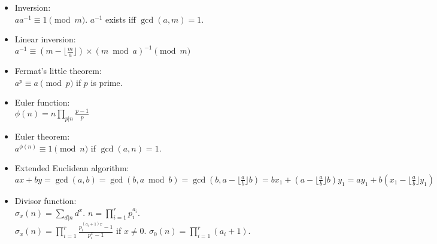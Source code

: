 \documentclass[twocolumn]{article}
\begin{document}
\begin{itemize}
    \item Inversion:\\ $aa^{-1} \equiv 1 \pmod{m}$. $a^{-1}$ exists iff $\gcd(a,m)=1$.
    \item Linear inversion:\\ $a^{-1} \equiv (m - \lfloor\frac{m}{a}\rfloor) \times (m \bmod a)^{-1} \pmod{m}$
    \item Fermat's little theorem:\\ $a^p \equiv a \pmod{p}$ if $p$ is prime.
    \item Euler function:\\ $\phi(n)=n \prod_{p|n} \frac{p-1}{p}$
    \item Euler theorem:\\ $a^{\phi(n)} \equiv 1 \pmod{n}$ if $\gcd(a,n) = 1$.
    \item Extended Euclidean algorithm:\\
    $ax+by=\gcd(a,b)=\gcd(b, a \bmod b)=\gcd(b, a-\lfloor\frac{a}{b}\rfloor b)=bx_1+(a-\lfloor\frac{a}{b}\rfloor b)y_1=ay_1+b(x_1-\lfloor\frac{a}{b}\rfloor y_1)$
    \item Divisor function:\\ $\sigma_x(n) = \sum_{d|n}d^x$. $n=\prod_{i=1}^r p_i^{a_i}$.\\ $\sigma_x(n)=\prod_{i=1}^r \frac{p_i^{(a_i+1)x}-1}{p_i^x-1}$ if $x \neq 0$. $\sigma_0(n)=\prod_{i=1}^r (a_i+1)$.
\end{itemize}
\end{document}
